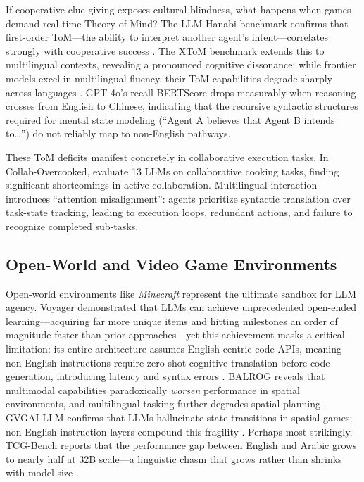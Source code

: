 \documentclass[11pt]{article}
\begin{document}
If cooperative clue-giving exposes cultural blindness, what happens when games demand real-time Theory of Mind? The LLM-Hanabi benchmark confirms that first-order ToM---the ability to interpret another agent's intent---correlates strongly with cooperative success \citep{chen2025llmhanabi}. The XToM benchmark extends this to multilingual contexts, revealing a pronounced cognitive dissonance: while frontier models excel in multilingual fluency, their ToM capabilities degrade sharply across languages \citep{chan2025xtom}. GPT-4o's recall BERTScore drops measurably when reasoning crosses from English to Chinese, indicating that the recursive syntactic structures required for mental state modeling (``Agent A believes that Agent B intends to\ldots'') do not reliably map to non-English pathways.

These ToM deficits manifest concretely in collaborative execution tasks. In Collab-Overcooked, \citet{sun2025overcooked} evaluate 13 LLMs on collaborative cooking tasks, finding significant shortcomings in active collaboration. Multilingual interaction introduces ``attention misalignment'': agents prioritize syntactic translation over task-state tracking, leading to execution loops, redundant actions, and failure to recognize completed sub-tasks.

\subsection{Open-World and Video Game Environments}
\label{sec:text_rpg}

Open-world environments like \textit{Minecraft} represent the ultimate sandbox for LLM agency. Voyager demonstrated that LLMs can achieve unprecedented open-ended learning---acquiring far more unique items and hitting milestones an order of magnitude faster than prior approaches---yet this achievement masks a critical limitation: its entire architecture assumes English-centric code APIs, meaning non-English instructions require zero-shot cognitive translation before code generation, introducing latency and syntax errors \citep{wang2024voyager}. BALROG reveals that multimodal capabilities paradoxically \textit{worsen} performance in spatial environments, and multilingual tasking further degrades spatial planning \citep{paischer2024balrog}. GVGAI-LLM confirms that LLMs hallucinate state transitions in spatial games; non-English instruction layers compound this fragility \citep{chen2025gvgai}. Perhaps most strikingly, TCG-Bench reports that the performance gap between English and Arabic grows to nearly half at 32B scale---a linguistic chasm that grows rather than shrinks with model size \citep{wang2025tcgbench}.
\end{document}
